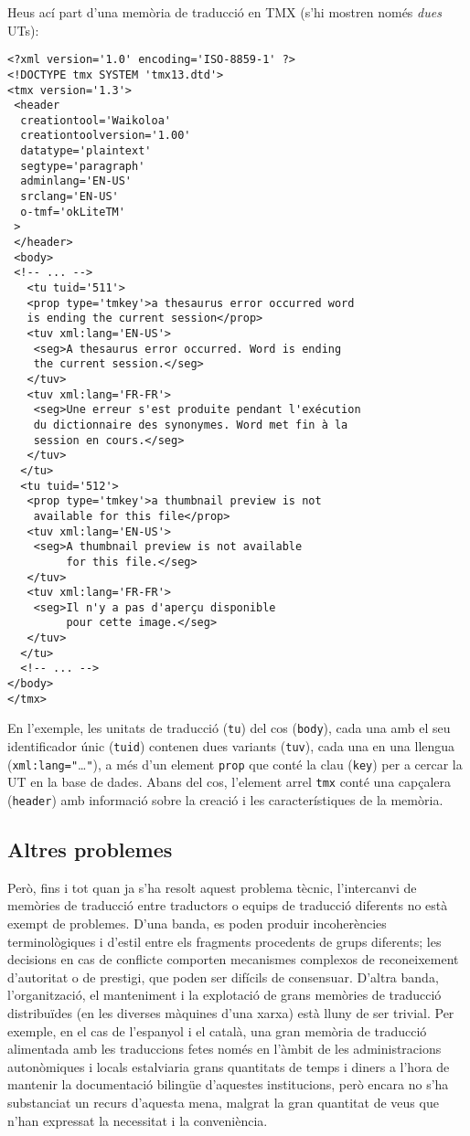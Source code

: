 Heus ací part d'una memòria de traducció en TMX (s'hi mostren només
\emph{dues} UTs):
\begin{verbatim}
<?xml version='1.0' encoding='ISO-8859-1' ?>
<!DOCTYPE tmx SYSTEM 'tmx13.dtd'>
<tmx version='1.3'>
 <header
  creationtool='Waikoloa'
  creationtoolversion='1.00'
  datatype='plaintext'
  segtype='paragraph'
  adminlang='EN-US'
  srclang='EN-US'
  o-tmf='okLiteTM'
 >
 </header>
 <body>
 <!-- ... -->
   <tu tuid='511'>
   <prop type='tmkey'>a thesaurus error occurred word 
   is ending the current session</prop>
   <tuv xml:lang='EN-US'> 
    <seg>A thesaurus error occurred. Word is ending 
    the current session.</seg>
   </tuv>
   <tuv xml:lang='FR-FR'> 
    <seg>Une erreur s'est produite pendant l'exécution 
    du dictionnaire des synonymes. Word met fin à la 
    session en cours.</seg>
   </tuv>
  </tu>
  <tu tuid='512'>
   <prop type='tmkey'>a thumbnail preview is not 
    available for this file</prop>
   <tuv xml:lang='EN-US'>
    <seg>A thumbnail preview is not available 
         for this file.</seg>
   </tuv>
   <tuv xml:lang='FR-FR'>
    <seg>Il n'y a pas d'aperçu disponible 
         pour cette image.</seg>
   </tuv>
  </tu>
  <!-- ... -->
</body>
</tmx>
\end{verbatim}
En l'exemple, les unitats de traducció (\texttt{tu}) del cos
(\texttt{body}), cada una amb el seu identificador únic
(\texttt{tuid}) contenen dues variants (\texttt{tuv}), cada una en una
llengua (\texttt{xml:lang="}\ldots\texttt{"}), a més d'un element
\texttt{prop} que conté la clau (\texttt{key}) per a cercar la UT en
la base de dades. Abans del cos, l'element arrel \texttt{tmx} conté
una capçalera (\texttt{header}) amb informació sobre la creació i les
característiques de la memòria.

\subsection{Altres problemes}

Però, fins i tot quan ja s'ha resolt aquest problema tècnic,
l'intercanvi de memòries de traducció entre traductors o equips de
traducció diferents no està exempt de problemes. D'una banda, es poden
produir incoherències terminològiques i d'estil entre els fragments
procedents de grups diferents; les decisions en cas de conflicte
comporten mecanismes complexos de reconeixement d'autoritat o de
prestigi, que poden ser difícils de consensuar. D'altra banda,
l'organització, el manteniment i la explotació de grans memòries de
traducció distribuïdes (en les diverses màquines d'una xarxa) està
lluny de ser trivial. Per exemple, en el cas de l'espanyol i el català,
una gran memòria de traducció alimentada amb les traduccions fetes
només en l'àmbit de les administracions autonòmiques i locals
estalviaria grans quantitats de temps i diners a l'hora de mantenir la
documentació bilingüe d'aquestes institucions, però encara no s'ha
substanciat un recurs d'aquesta mena, malgrat la gran quantitat de
veus que n'han expressat la necessitat i la conveniència.



